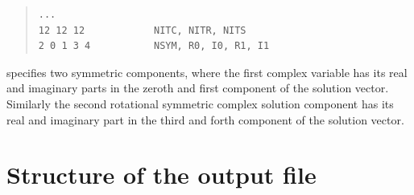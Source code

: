 \documentclass[10pt,a4paper]{ddedoc}
\begin{document}
\begin{description}
{ \small \begin{quote} \begin{lstlisting}[basicstyle=\tt,frame=single]
...
12 12 12            NITC, NITR, NITS
2 0 1 3 4           NSYM, R0, I0, R1, I1
\end{lstlisting} \end{quote} } \noindent
specifies two symmetric components, where the first complex variable has its real and imaginary parts in the zeroth and first component of the solution vector.
Similarly the second rotational symmetric complex solution component has its real and imaginary part in the third and forth component of the solution vector.
\end{description}


\section{Structure of the output file}
\end{document}
